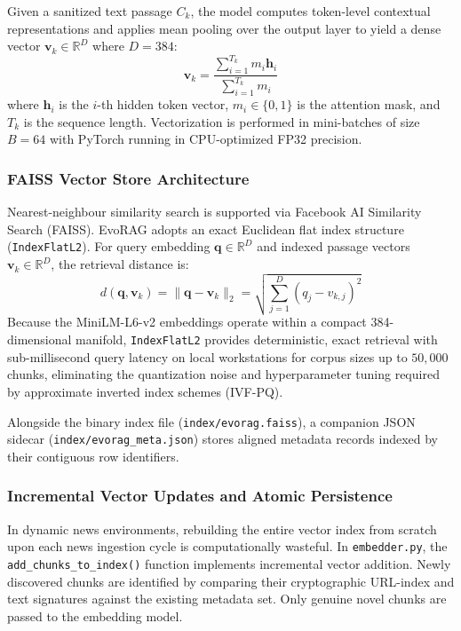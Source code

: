 Given a sanitized text passage $C_k$, the model computes token-level contextual representations and applies mean pooling over the output layer to yield a dense vector $\mathbf{v}_k \in \mathbb{R}^{D}$ where $D = 384$:
\begin{equation}
\label{eq:mean_pooling}
\mathbf{v}_k = \frac{\sum_{i=1}^{T_k} m_i \mathbf{h}_i}{\sum_{i=1}^{T_k} m_i}
\end{equation}
where $\mathbf{h}_i$ is the $i$-th hidden token vector, $m_i \in \{0, 1\}$ is the attention mask, and $T_k$ is the sequence length. Vectorization is performed in mini-batches of size $B = 64$ with PyTorch running in CPU-optimized FP32 precision.

\subsubsection{FAISS Vector Store Architecture}
Nearest-neighbour similarity search is supported via Facebook AI Similarity Search (FAISS). EvoRAG adopts an exact Euclidean flat index structure (\texttt{IndexFlatL2}). For query embedding $\mathbf{q} \in \mathbb{R}^{D}$ and indexed passage vectors $\mathbf{v}_k \in \mathbb{R}^{D}$, the retrieval distance is:
\begin{equation}
\label{eq:l2_distance}
d(\mathbf{q}, \mathbf{v}_k) = \|\mathbf{q} - \mathbf{v}_k\|_2 = \sqrt{\sum_{j=1}^{D} (q_j - v_{k,j})^2}
\end{equation}
Because the MiniLM-L6-v2 embeddings operate within a compact 384-dimensional manifold, \texttt{IndexFlatL2} provides deterministic, exact retrieval with sub-millisecond query latency on local workstations for corpus sizes up to $50,000$ chunks, eliminating the quantization noise and hyperparameter tuning required by approximate inverted index schemes (IVF-PQ).

Alongside the binary index file (\texttt{index/evorag.faiss}), a companion JSON sidecar (\texttt{index/evorag\_meta.json}) stores aligned metadata records indexed by their contiguous row identifiers.

\subsubsection{Incremental Vector Updates and Atomic Persistence}
In dynamic news environments, rebuilding the entire vector index from scratch upon each news ingestion cycle is computationally wasteful. In \texttt{embedder.py}, the \texttt{add\_chunks\_to\_index()} function implements incremental vector addition. Newly discovered chunks are identified by comparing their cryptographic URL-index and text signatures against the existing metadata set. Only genuine novel chunks are passed to the embedding model.

